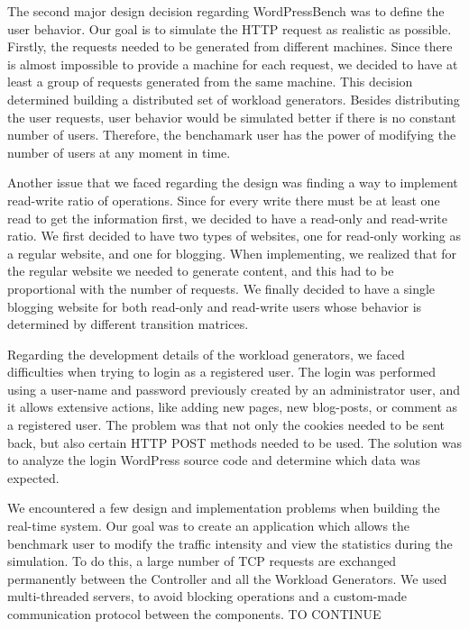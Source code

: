 The second major design decision regarding WordPressBench was to define the user behavior. Our goal is to simulate the HTTP request as realistic as possible. Firstly, the requests needed to be generated from different machines. Since there is almost impossible to provide a machine for each request, we decided to have at least a group of requests generated from the same machine. This decision determined building a distributed set of workload generators. Besides distributing the user requests, user behavior would be simulated better if there is no constant number of users. Therefore, the benchamark user has the power of modifying the number of users at any moment in time.

Another issue that we faced regarding the design was finding a way to implement read-write ratio of operations. Since for every write there must be at least one read to get the information first, we decided to have a read-only and read-write ratio. We first decided to have two types of websites, one for read-only working as a regular website, and one for blogging. When implementing, we realized that for the regular website we needed to generate content, and this had to be proportional with the number of requests. We finally decided to have a single blogging website for both read-only and read-write users whose behavior is determined by different transition matrices.

Regarding the development details of the workload generators, we faced difficulties when trying to login as a registered user. The login was performed using a user-name and password previously created by an administrator user, and it allows extensive actions, like adding new pages, new blog-posts, or comment as a registered user. The problem was that not only the cookies needed to be sent back, but also certain HTTP POST methods needed to be used. The solution was to analyze the login WordPress source code and determine which data was expected. 

We encountered a few design and implementation problems when building the real-time system. Our goal was to create an application which allows the benchmark user to modify the traffic intensity and view the statistics during the simulation. To do this, a large number of TCP requests are exchanged permanently between the Controller and all the Workload Generators. We used multi-threaded servers, to avoid blocking operations and a custom-made communication protocol between the components.
TO CONTINUE
